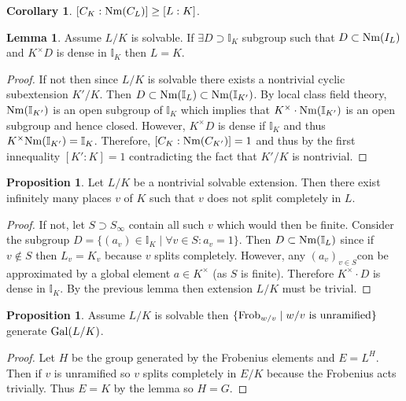 \documentclass[12pt]{extarticle}
\newcommand{\idele}[1]{\mathbb{I}_{#1}}
\theoremstyle{definition}
\newtheorem{lemma}[theorem]{Lemma}
\newtheorem{proposition}[theorem]{Proposition}
\newtheorem{corollary}[theorem]{Corollary}
\begin{document}
\begin{corollary}
$[ C_K : \mathrm{Nm}(C_L) ] \ge [L : K]$. 
\end{corollary}

\begin{lemma}
Assume $L / K$ is solvable. If $\exists D \supset \idele{K}$ subgroup such that $D \subset \mathrm{Nm}(I_L)$ and $K^\times D$ is dense in $\idele{K}$ then $L = K$.
\end{lemma}

\begin{proof}
If not then since $L / K$ is solvable there exists a nontrivial cyclic subextension $K' / K$. Then $D \subset \Nm(\idele{L}) \subset \Nm(\idele{K'})$. By local class field theory, $\Nm(\idele{K'})$ is an open subgroup of $\idele{K}$ which implies that $K^\times \cdot \Nm(\idele{K'})$ is an open subgroup and hence closed. However, $K^\times D$ is dense if $\idele{K}$ and thus $K^\times \Nm(\idele{K'}) = \idele{K}$. Therefore, $[C_K : \mathrm{Nm}(C_{K'})] = 1$ and thus by the first innequality $[K' : K] = 1$ contradicting the fact that $K' / K$ is nontrivial. 
\end{proof}

\begin{proposition}
Let $L / K$ be a nontrivial solvable extension. Then there exist infinitely many places $v$ of $K$ such that $v$ does not split completely in $L$. 
\end{proposition}

\begin{proof}
If not, let $S \supset S_\infty$ contain all such $v$ which would then be finite. Consider the subgroup $D = \{ (a_v) \in \idele{K} \mid \forall v \in S : a_v = 1 \}$. Then $D \subset \Nm(\idele{L})$ since if $v \notin S$ then $L_v = K_v$ because $v$ splits completely. However, any $(a_v)_{v \in S}$con be approximated by a global element $a \in K^\times$ (as $S$ is finite). Therefore $K^\times \cdot D$ is dense in $\idele{K}$. By the previous lemma then extension $L / K$ must be trivial.   
\end{proof}

\begin{proposition}
Assume $L / K$ is solvable then $\{ \mathrm{Frob}_{w/v} \mid w/v \text{ is unramified} \}$ generate $\mathrm{Gal} (L/K)$.  
\end{proposition}

\begin{proof}
Let $H$ be the group generated by the Frobenius elements and $E = L^H$. Then if $v$ is unramified so $v$ splits completely in $E / K$ because the Frobenius acts trivially. Thus $E = K$ by the lemma so $H = G$. 
\end{proof}
\end{document}
